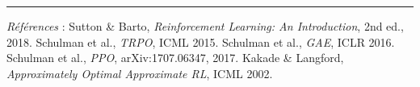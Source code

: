 \documentclass[a4paper,11pt]{article}
\theoremstyle{clean}
\begin{document}
\medskip\hrule\smallskip
{\footnotesize \textit{Références} : Sutton \& Barto, \emph{Reinforcement Learning: An Introduction}, 2nd ed., 2018. Schulman et al., \emph{TRPO}, ICML 2015. Schulman et al., \emph{GAE}, ICLR 2016. Schulman et al., \emph{PPO}, arXiv:1707.06347, 2017. Kakade \& Langford, \emph{Approximately Optimal Approximate RL}, ICML 2002.}
\end{document}
